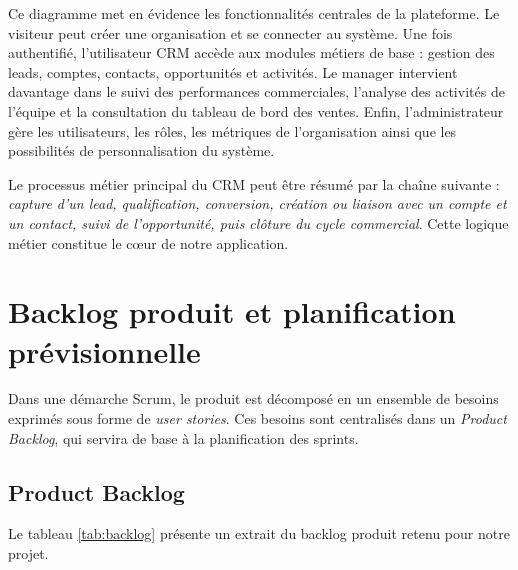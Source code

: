 \documentclass[12pt,a4paper]{report}
\begin{document}
\newpage

Ce diagramme met en évidence les fonctionnalités centrales de la plateforme. Le visiteur peut créer une organisation et se connecter au système. Une fois authentifié, l’utilisateur CRM accède aux modules métiers de base : gestion des leads, comptes, contacts, opportunités et activités. Le manager intervient davantage dans le suivi des performances commerciales, l’analyse des activités de l’équipe et la consultation du tableau de bord des ventes. Enfin, l’administrateur gère les utilisateurs, les rôles, les métriques de l’organisation ainsi que les possibilités de personnalisation du système.

Le processus métier principal du CRM peut être résumé par la chaîne suivante : \textit{capture d’un lead, qualification, conversion, création ou liaison avec un compte et un contact, suivi de l’opportunité, puis clôture du cycle commercial}. Cette logique métier constitue le cœur de notre application.

\section{Backlog produit et planification prévisionnelle}

Dans une démarche Scrum, le produit est décomposé en un ensemble de besoins exprimés sous forme de \textit{user stories}. Ces besoins sont centralisés dans un \textit{Product Backlog}, qui servira de base à la planification des sprints.

\subsection{Product Backlog}

Le tableau \ref{tab:backlog} présente un extrait du backlog produit retenu pour notre projet.
\end{document}
